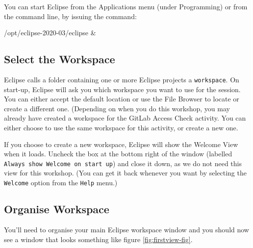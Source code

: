 \documentclass[
]{book}
\newenvironment{Shaded}{\begin{snugshade}}{\end{snugshade}}
\newcommand{\NormalTok}[1]{#1}
\begin{document}
You can start Eclipse from the Applications menu (under Programming) or from the command line, by issuing the command:

\begin{Shaded}
\begin{Highlighting}[]
\NormalTok{/opt/eclipse{-}2020{-}03/eclipse \&}
\end{Highlighting}
\end{Shaded}

\hypertarget{selectw}{%
\subsection{Select the Workspace}\label{selectw}}

Eclipse calls a folder containing one or more Eclipse projects a \texttt{workspace}. On start-up, Eclipse will ask you which workspace you want to use for the session. You can either accept the default location or use the File Browser to locate or create a different one. (Depending on when you do this workshop, you may already have created a workspace for the GitLab Access Check activity. You can either choose to use the same workspace for this activity, or create a new one.

If you choose to create a new workspace, Eclipse will show the Welcome View when it loads. Uncheck the box at the bottom right of the window (labelled \texttt{Always\ show\ Welcome\ on\ start\ up}) and close it down, as we do not need this view for this workshop. (You can get it back whenever you want by selecting the \texttt{Welcome} option from the \texttt{Help} menu.)

\hypertarget{organisew}{%
\subsection{Organise Workspace}\label{organisew}}

You'll need to organise your main Eclipse workspace window and you should now see a window that looks something like figure \ref{fig:firstview-fig}.
\end{document}
